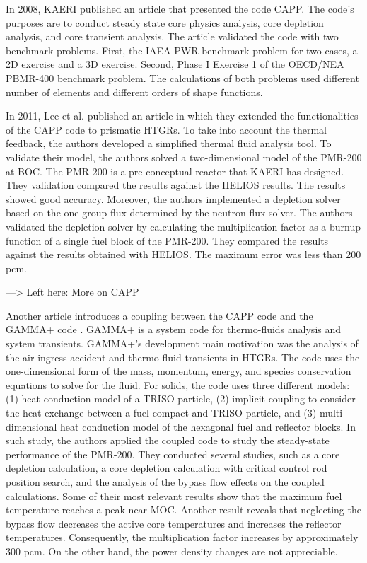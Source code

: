 \documentclass[11pt,letterpaper]{article}
\begin{document}
In 2008, \gls{KAERI} published an article \cite{lee_development_2008} that presented the code CAPP.
The code's purposes are to conduct steady state core physics analysis, core depletion analysis, and core transient analysis.
The article validated the code with two benchmark problems.
First, the IAEA PWR benchmark problem for two cases, a 2D exercise and a 3D exercise.
Second, Phase I Exercise 1 of the OECD/NEA PBMR-400 benchmark problem.
The calculations of both problems used different number of elements and different orders of shape functions.

In 2011, Lee et al. published an article \cite{lee_development_2011} in which they extended the functionalities of the CAPP code to prismatic \glspl{HTGR}.
To take into account the thermal feedback, the authors developed a simplified thermal fluid analysis tool.
To validate their model, the authors solved a two-dimensional model of the PMR-200 at \gls{BOC}.
The PMR-200 is a pre-conceptual reactor that \gls{KAERI} has designed.
They validation compared the results against the HELIOS results.
The results showed good accuracy.
Moreover, the authors implemented a depletion solver based on the one-group flux determined by the neutron flux solver.
The authors validated the depletion solver by calculating the multiplication factor as a burnup function of a single fuel block of the PMR-200.
They compared the results against the results obtained with HELIOS.
The maximum error was less than 200 pcm.


---> Left here: More on CAPP








Another article \cite{tak_cappgamma_2016} introduces a coupling between the CAPP code and the GAMMA+ code \cite{lim_gamma_2006}.
GAMMA+ is a system code for thermo-fluids analysis and system transients.
GAMMA+'s development main motivation was the analysis of the air ingress accident and thermo-fluid transients in \glspl{HTGR}.
The code uses the one-dimensional form of the mass, momentum, energy, and species conservation equations to solve for the fluid.
For solids, the code uses three different models: (1) heat conduction model of a TRISO particle, (2) implicit coupling to consider the heat exchange between a fuel compact and TRISO particle, and (3) multi-dimensional heat conduction model of the hexagonal fuel and reflector blocks.
In such study, the authors applied the coupled code to study the steady-state performance of the PMR-200.
They conducted several studies, such as a core depletion calculation, a core depletion calculation with critical control rod position search, and the analysis of the bypass flow effects on the coupled calculations.
Some of their most relevant results show that the maximum fuel temperature reaches a peak near MOC.
Another result reveals that neglecting the bypass flow decreases the active core temperatures and increases the reflector temperatures.
Consequently, the multiplication factor increases by approximately 300 pcm.
On the other hand, the power density changes are not appreciable.
\end{document}
